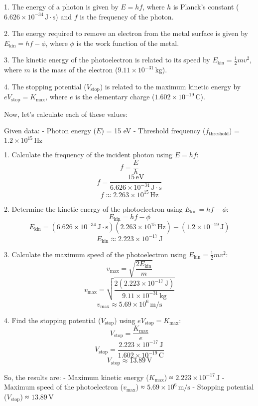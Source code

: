 \documentclass[addpoints]{exam}
\begin{document}
\begin{questions}
\begin{solution}
1. The energy of a photon is given by \(E = hf\), where \(h\) is Planck's constant (\(6.626 \times 10^{-34} \, \text{J}\cdot\text{s}\)) and \(f\) is the frequency of the photon.

2. The energy required to remove an electron from the metal surface is given by \(E_{\text{kin}} = hf - \phi\), where \(\phi\) is the work function of the metal.

3. The kinetic energy of the photoelectron is related to its speed by \(E_{\text{kin}} = \frac{1}{2} m v^2\), where \(m\) is the mass of the electron (\(9.11 \times 10^{-31} \, \text{kg}\)).

4. The stopping potential (\(V_{\text{stop}}\)) is related to the maximum kinetic energy by \(eV_{\text{stop}} = K_{\text{max}}\), where \(e\) is the elementary charge (\(1.602 \times 10^{-19} \, \text{C}\)).

Now, let's calculate each of these values:

Given data:
- Photon energy (\(E\)) = 15 eV
- Threshold frequency (\(f_{\text{threshold}}\)) = \(1.2 \times 10^{15} \, \text{Hz}\)

1. Calculate the frequency of the incident photon using \(E = hf\):
   \[f = \frac{E}{h} \]
   \[f = \frac{15 \, \text{eV}}{6.626 \times 10^{-34} \, \text{J}\cdot\text{s}} \]
   \[f \approx 2.263 \times 10^{15} \, \text{Hz}\]

2. Determine the kinetic energy of the photoelectron using \(E_{\text{kin}} = hf - \phi\):
   \[E_{\text{kin}} = hf - \phi \]
   \[E_{\text{kin}} = (6.626 \times 10^{-34} \, \text{J}\cdot\text{s})(2.263 \times 10^{15} \, \text{Hz}) - (1.2 \times 10^{-19} \, \text{J}) \]
   \[E_{\text{kin}} \approx 2.223 \times 10^{-17} \, \text{J}\]

3. Calculate the maximum speed of the photoelectron using \(E_{\text{kin}} = \frac{1}{2} m v^2\):
   \[v_{\text{max}} = \sqrt{\frac{2E_{\text{kin}}}{m}} \]
   \[v_{\text{max}} = \sqrt{\frac{2(2.223 \times 10^{-17} \, \text{J})}{9.11 \times 10^{-31} \, \text{kg}}} \]
   \[v_{\text{max}} \approx 5.69 \times 10^6 \, \text{m/s}\]

4. Find the stopping potential (\(V_{\text{stop}}\)) using \(eV_{\text{stop}} = K_{\text{max}}\):
   \[V_{\text{stop}} = \frac{K_{\text{max}}}{e} \]
   \[V_{\text{stop}} = \frac{2.223 \times 10^{-17} \, \text{J}}{1.602 \times 10^{-19} \, \text{C}} \]
   \[V_{\text{stop}} \approx 13.89 \, \text{V}\]

So, the results are:
- Maximum kinetic energy (\(K_{\text{max}}\)) ≈ \(2.223 \times 10^{-17} \, \text{J}\)
- Maximum speed of the photoelectron (\(v_{\text{max}}\)) ≈ \(5.69 \times 10^6 \, \text{m/s}\)
- Stopping potential (\(V_{\text{stop}}\)) ≈ \(13.89 \, \text{V}\)
    \end{solution}        
\end{questions}
\end{document}
